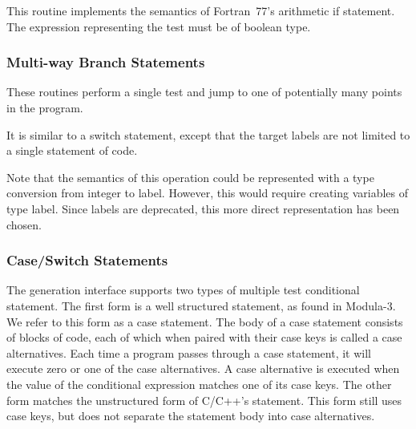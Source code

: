 \begin{functionality}
This routine implements the semantics of Fortran~77's arithmetic if
statement.  
The expression representing the test must be of boolean type.
\end{functionality}

\subsubsection{Multi-way Branch Statements}
These routines perform a single test and jump to one of potentially
many points in the program.

\begin{functionality}
\end{functionality}
\begin{functionality}
It is similar to a switch statement, except that the
target labels are not limited to a single statement of code.
\end{functionality}
\begin{functionality}

Note that the semantics of this operation could be represented with a
type conversion from integer to label.  However, this would require
creating variables of type label.  Since labels are deprecated, this
more direct representation has been chosen.
\end{functionality}
\begin{functionality}
\end{functionality}

\subsubsection{Case/Switch Statements}
The generation interface supports two types of multiple test
conditional statement.  The first form is a well structured statement,
as found in Modula-3.  We refer to this form as a case statement.  The
body of a case statement consists of blocks of code, each of which
when paired with their case keys is called a case alternatives.
Each time a program passes through a case statement, it will execute
zero or one of the case alternatives.  A case alternative is executed
when the value of the conditional expression matches one of its case
keys.  The other form matches the unstructured form of C/C++'s
 statement.   This form still uses case keys, but does not
separate the  statement body into case alternatives.

